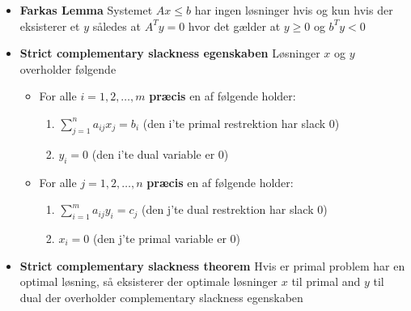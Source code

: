 \begin{itemize}
\begin{proof}
  \end{proof}
  \item \textbf{Farkas Lemma} Systemet $Ax \leq b$ har ingen løsninger hvis og kun hvis der eksisterer et $y$ således at $A^T y = 0$ hvor det gælder at $y \geq 0$ og $b^T y <0$
  \item \textbf{Strict complementary slackness egenskaben} Løsninger $x$ og $y$ overholder følgende
  \begin{itemize}
  	\item For alle $i=1,2,\dots,m$ \textbf{præcis} en af følgende holder:
    \begin{enumerate}
    	\item $\sum_{j=1}^na_{ij}x_j=b_i$ \quad (den i'te primal restrektion har slack $0$)
      \item $y_i=0$ \hspace{50pt} (den i'te dual variable er $0$)
    \end{enumerate}
  	\item For alle $j=1,2,\dots,n$ \textbf{præcis} en af følgende holder:
    \begin{enumerate}
    	\item $\sum_{i=1}^ma_{ij}y_i=c_j$ \quad (den j'te dual restrektion har slack $0$)
      \item $x_i=0$ \hspace{50pt} (den j'te primal variable er $0$)
    \end{enumerate}
  \end{itemize}
  \item \textbf{Strict complementary slackness theorem} Hvis er primal problem har en optimal løsning, så eksisterer der optimale løsninger $x$ til primal and $y$ til dual der overholder complementary slackness egenskaben \\
\end{itemize}

